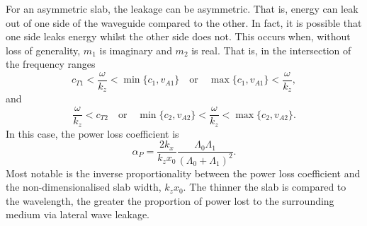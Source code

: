 \documentclass[12pt]{../style-files/ociamthesis}
\begin{document}
	For an asymmetric slab, the leakage can be asymmetric. That is, energy can leak out of one side of the waveguide compared to the other. In fact, it is possible that one side leaks energy whilst the other side does not. This occurs when, without loss of generality, $m_1$ is imaginary and $m_2$ is real. That is, in the intersection of the frequency ranges
	\begin{equation}
	c_{T1} < \frac{\omega}{k_z} < \min\{c_1, v_{A1}\} \quad \text{or} \quad \max\{c_1, v_{A1}\} < \frac{\omega}{k_z},
	\end{equation}
	and
	\begin{equation}
	\frac{\omega}{k_z} < c_{T2} \quad \text{or} \quad \min\{c_2, v_{A2}\} < \frac{\omega}{k_z} < \max\{c_2, v_{A2}\}.
	\end{equation}
	In this case, the power loss coefficient is 
	\begin{equation}
	\alpha_P = \frac{2k_x}{k_zx_0}\frac{\Lambda_0\Lambda_1}{(\Lambda_0 + \Lambda_1)^2}.
	\end{equation}
	Most notable is the inverse proportionality between the power loss coefficient and the non-dimensionalised slab width, $k_z x_0$. The thinner the slab is compared to the wavelength, the greater the proportion of power lost to the surrounding medium via lateral wave leakage.
	



\end{document}
